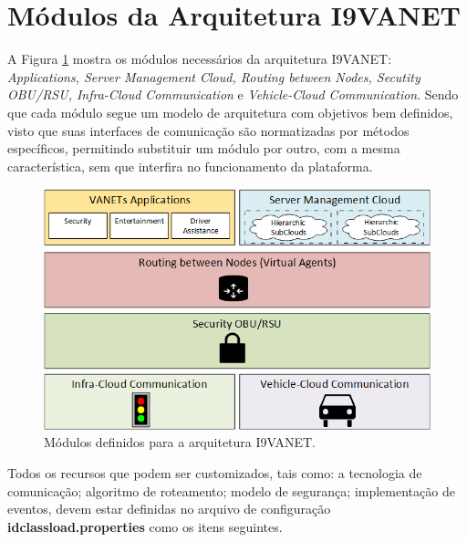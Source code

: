 \documentclass[
	12pt,				%
	oneside,			%
	a4paper,			%
	english,			%
	brazil				%
	]{abntex2ppgsi}
\begin{document}
\section{Módulos da Arquitetura I9VANET}

A Figura \ref{fig:dModulos} mostra os módulos necessários da arquitetura I9VANET:  \textit{Applications, Server Management Cloud, Routing between Nodes, Secutity OBU/RSU, Infra-Cloud Communication} e \textit{Vehicle-Cloud Communication}. Sendo que cada módulo segue um modelo de arquitetura com objetivos bem definidos, visto que suas interfaces de comunicação são normatizadas por métodos específicos, permitindo substituir um módulo por outro, com a mesma característica, sem que interfira no funcionamento da plataforma.

\begin{figure}[h!]
	\centering
	\includegraphics [width=12cm,height=7cm] {images/modulos.png}
	\caption{Módulos definidos para a arquitetura I9VANET.}
	\label{fig:dModulos}
\end{figure}

Todos os recursos que podem ser customizados, tais como: a tecnologia de comunicação; algoritmo de roteamento; modelo de segurança; implementação de eventos, devem estar definidas no arquivo de configuração \textbf{idclassload.properties} como os itens seguintes.
\end{document}
